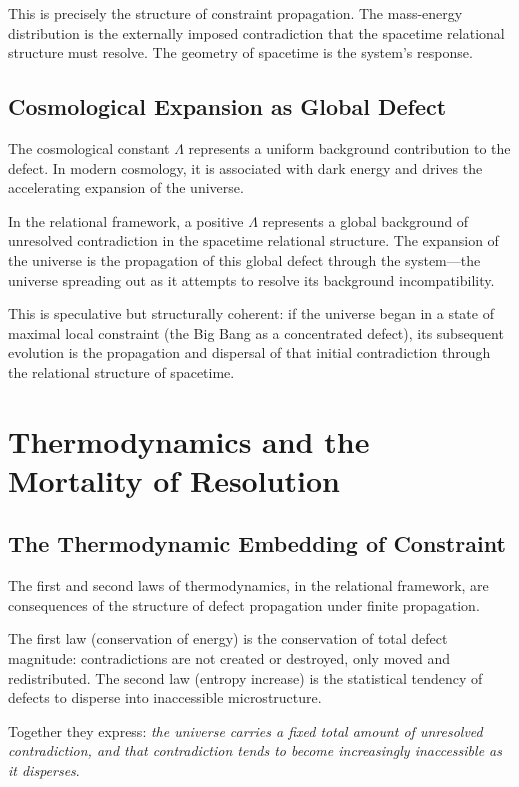 \documentclass[12pt,a4paper,openany]{book}
\theoremstyle{plain}
\theoremstyle{definition}
\theoremstyle{remark}
\begin{document}
This is precisely the structure of constraint propagation. The mass-energy distribution is the externally imposed contradiction that the spacetime relational structure must resolve. The geometry of spacetime is the system's response.

\section{Cosmological Expansion as Global Defect}

The cosmological constant $\Lambda$ represents a uniform background contribution to the defect. In modern cosmology, it is associated with dark energy and drives the accelerating expansion of the universe.

In the relational framework, a positive $\Lambda$ represents a global background of unresolved contradiction in the spacetime relational structure. The expansion of the universe is the propagation of this global defect through the system---the universe spreading out as it attempts to resolve its background incompatibility.

This is speculative but structurally coherent: if the universe began in a state of maximal local constraint (the Big Bang as a concentrated defect), its subsequent evolution is the propagation and dispersal of that initial contradiction through the relational structure of spacetime.

\chapter{Thermodynamics and the Mortality of Resolution}

\section{The Thermodynamic Embedding of Constraint}

The first and second laws of thermodynamics, in the relational framework, are consequences of the structure of defect propagation under finite propagation.

The first law (conservation of energy) is the conservation of total defect magnitude: contradictions are not created or destroyed, only moved and redistributed. The second law (entropy increase) is the statistical tendency of defects to disperse into inaccessible microstructure.

Together they express: \emph{the universe carries a fixed total amount of unresolved contradiction, and that contradiction tends to become increasingly inaccessible as it disperses}.
\end{document}
